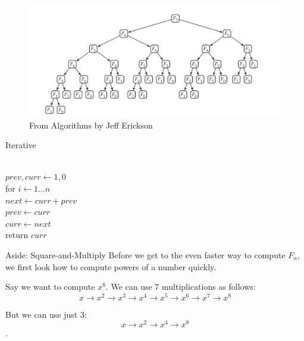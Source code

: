 \documentclass[aspectratio=169, handout]{beamer}
\begin{document}
\begin{frame}{}
    \begin{figure}
        \centering
        \includegraphics[scale=0.4]{F7_Recursion.png}
        \caption{From Algorithms by Jeff Erickson}
    \end{figure}
\end{frame}

\begin{frame}{Iterative}
    \begin{algo}
        \+
    \\      $prev, curr \gets 1, 0$ 
    \\      for $i \gets 1 \ldots n$\+
    \\          $next \gets curr + prev$
    \\          $prev \gets curr$
    \\          $curr \gets next$\-
    \\      return $curr$
    \end{algo}
\end{frame}

\begin{frame}{Aside: Square-and-Multiply}
    Before we get to the even faster way to compute $F_n$, we first look how to compute powers of a number quickly.
    
    Say we want to compute $x^8$. We can use 7 multiplications as follows: 
    $$x \to x^2 \to x^3 \to x^4 \to x^5 \to x^6 \to x^7 \to x^8$$ 
    
    \pause
    
    But we can use just 3: 
    $$x \to x^2 \to x^4 \to x^8$$.
    
\end{frame}
\end{document}
